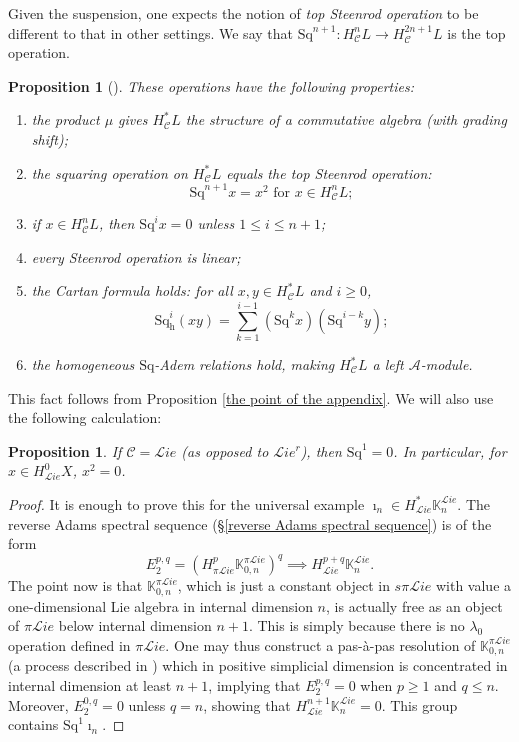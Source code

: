 \documentclass[11pt]{amsart} \renewcommand{\baselinestretch}{1.2}
\theoremstyle{plain}
\newtheorem{prop}[thm]{Proposition}
\numberwithin{equation}{section} %
\theoremstyle{plain}
\newtheorem{prop}[thm]{Proposition}
\numberwithin{equation}{chapter} %
\renewcommand{\to}{\longrightarrow}
\newcommand{\scrL}{\mathscr{L}}
\newcommand{\calA}{\mathcal{A}}
\newcommand{\calc}{\mathcal{C}}
\newcommand{\citeBOX}[2][]{\cite[\mbox{#1}]{#2}}
\newcommand{\PA}[1]{\pi#1}
\newcommand{\Sq}{\mathrm{Sq}}
\newcommand{\LieSteen}{\calA}
\newcommand{\liealgs}{{\scrL\!\textit{ie}}}
\newcommand{\restliealgs}{{\scrL\!\textit{ie}^\textit{r}}}
\newcommand{\dhor}{_\mathrm{h}}
\newcommand{\Sqh}{\mathrm{Sq}\dhor}
\begin{document}
\begin{Constructing cohomology operations}
Given the suspension, one expects the notion of \emph{top Steenrod operation} to be different to that in other settings. We say that $\Sq^{n+1}:H^n_\calc L\to H^{2n+1}_\calc L$ is the top operation.
\begin{prop}[{\citeBOX[\S5.3]{PriddySimplicialLie.pdf}}]
\label{omnibus on coh of simp lie algs}These operations have the following properties:
\begin{enumerate}
\item the product $\mu$ gives $H^*_{\calc}L$ the structure of a commutative algebra (with grading shift);
\item the squaring operation on $H^*_{\calc}L$ equals the \emph{top Steenrod operation}:
\[\Sq^{n+1}x=x^{2}\text{\ \ for $x\in H^n_{\calc}L$};\]
\item \label{Sq unstable vanishing} if $x\in H^n_{\calc}L$, then $\Sq^ix=0$ unless $1\leq i\leq n+1$;
\item every Steenrod operation is linear;
\item the \emph{Cartan formula} holds:  for all $x,y\in   H^*_{\calc}L$ and $i\geq0$,
\[\Sqh^i(xy)=\textstyle\sum_{k=1}^{i-1}(\Sq^kx)(\Sq^{i-k}y);\]
\item \label{yeah H is a Stmodule} the  homogeneous $\Sq$-Adem relations hold, making $H^{*}_\calc L$ a left $\LieSteen$-module.
\end{enumerate}
\end{prop}
This fact follows from Proposition \ref{the point of the appendix}. We will also use the following calculation:
\begin{prop}
\label{prop on sq1 on lie not rest}
If $\calc=\liealgs$ (as opposed to $\restliealgs$), then $\Sq^1=0$. In particular, for $x\in H^0_{\liealgs}X$, $x^2=0$.
\end{prop}
\begin{proof}
It is enough to prove this for the universal example $\imath_n\in H^*_{\liealgs}\mathbb{K}_n^{\liealgs}$. The reverse Adams spectral sequence (\S\ref{reverse Adams spectral sequence}) is of the form
\[E_2^{p,q}=(H^{p}_{\PA{\liealgs}}\mathbb{K}_{0,n}^{\PA{\liealgs}})^{q}\implies H^{p+q}_{\liealgs}\mathbb{K}_n^{\liealgs}.\]
The point now is that $\mathbb{K}_{0,n}^{\PA{\liealgs}}$, which is just a constant object in $s\PA{\liealgs}$ with value a one-dimensional Lie algebra in internal dimension $n$, is actually free as an object of $\PA{\liealgs}$ below internal dimension $n+1$. This is simply because there is no $\lambda_0$ operation defined in $\PA{\liealgs}$. One may thus construct a pas-\`a-pas resolution of $\mathbb{K}_{0,n}^{\PA{\liealgs}}$ (a process described in \cite{Andre-StepByStep}) which in positive simplicial dimension is concentrated in internal dimension at least $n+1$, implying that $E_2^{p,q}=0$ when $p\geq1$ and $q\leq n$. Moreover, $E_2^{0,q}=0$ unless $q=n$, showing that $H^{n+1}_{\liealgs}\mathbb{K}_n^{\liealgs}=0$. This group contains $\Sq^1\imath_n$.

\end{proof}
\end{Constructing cohomology operations}
\end{document}
